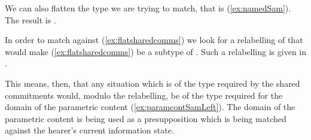 We can also flatten the type we are trying to match, that is
(\ref{ex:namedSam}).  The result is \nexteg{}.
\begin{ex} 
\end{ex} 

In order to match \preveg{} against (\ref{ex:flatsharedcomms}) we look
for a relabelling of \preveg{} that would make
(\ref{ex:flatsharedcomms}) be a subtype of \preveg{}.  Such a
relabelling is given in \nexteg{}.
\begin{ex} 
\end{ex}
This means, then, that any situation which is of the type required by
the shared commitments would, modulo the relabelling, be of the type
required for the domain of the parametric content
(\ref{ex:paramcontSamLeft}).  The domain of the parametric content is
being used as a presupposition which is being matched against the
hearer's current information state.

